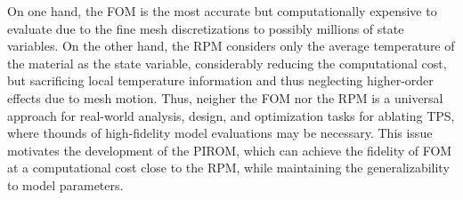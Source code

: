 On one hand, the FOM is the most accurate but computationally expensive to evaluate due to the fine mesh discretizations to possibly millions of state variables. On the other hand, the RPM considers only the average temperature of the material as the state variable, considerably reducing the computational cost, but sacrificing local temperature information and thus neglecting higher-order effects due to mesh motion. Thus, neigher the FOM nor the RPM is a universal approach for real-world analysis, design, and optimization tasks for ablating TPS, where thounds of high-fidelity model evaluations may be necessary. This issue motivates the development of the PIROM, which can achieve the fidelity of FOM at a computational cost close to the RPM, while maintaining the generalizability to model parameters.
